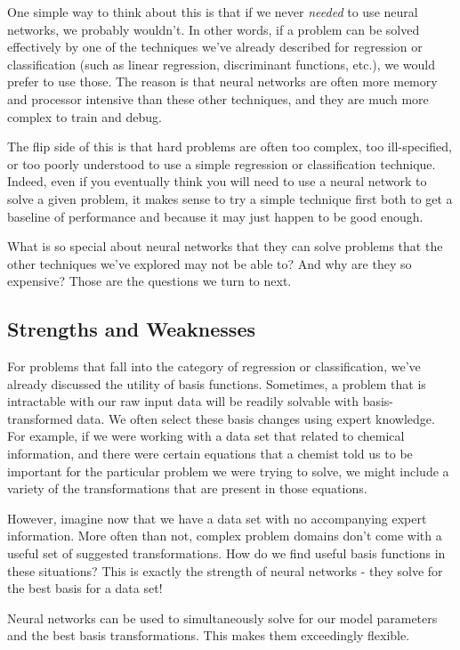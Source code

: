 One simple way to think about this is that if we never \textit{needed} to use neural networks, we probably wouldn't. In other words, if a problem can be solved effectively by one of the techniques we've already described for regression or classification (such as linear regression, discriminant functions, etc.), we would prefer to use those. The reason is that neural networks are often more memory and processor intensive than these other techniques, and they are much more complex to train and debug.

The flip side of this is that hard problems are often too complex, too ill-specified, or too poorly understood to use a simple regression or classification technique. Indeed, even if you eventually think you will need to use a neural network to solve a given problem, it makes sense to try a simple technique first both to get a baseline of performance and because it may just happen to be good enough.

What is so special about neural networks that they can solve problems that the other techniques we've explored may not be able to? And why are they so expensive? Those are the questions we turn to next.

\subsection{Strengths and Weaknesses}
For problems that fall into the category of regression or classification, we've already discussed the utility of basis functions. Sometimes, a problem that is intractable with our raw input data will be readily solvable with basis-transformed data. We often select these basis changes using expert knowledge. For example, if we were working with a data set that related to chemical information, and there were certain equations that a chemist told us to be important for the particular problem we were trying to solve, we might include a variety of the transformations that are present in those equations.

However, imagine now that we have a data set with no accompanying expert information. More often than not, complex problem domains don't come with a useful set of suggested transformations. How do we find useful basis functions in these situations? This is exactly the strength of neural networks - they solve for the best basis for a data set!

Neural networks can be used to simultaneously solve for our model parameters and the best basis transformations. This makes them exceedingly flexible.

